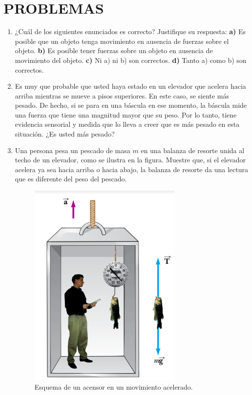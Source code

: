 \documentclass{article}
\begin{document}
\section*{PROBLEMAS}
\begin{enumerate}
\item ¿Cuál de los siguientes enunciados es correcto? Justifique su respuesta: \textbf{a)} Es posible que un objeto tenga movimiento en ausencia de fuerzas sobre el objeto. \textbf{b)} Es posible tener fuerzas sobre un objeto en ausencia de movimiento del objeto. \textbf{c)} Ni a) ni b) son correctos. \textbf{d)} Tanto a) como b) son correctos.

\item Es muy que probable que usted haya estado en un elevador que acelera hacia arriba mientras se mueve a pisos superiores. En este caso, se siente más pesado. De hecho, si se para en una báscula en ese momento, la báscula mide una fuerza que tiene una magnitud mayor que su peso. Por lo tanto, tiene evidencia sensorial y medida que lo lleva a creer que es más pesado en esta situación. ¿Es usted más pesado?

\item Una persona pesa un pescado de masa $m$ en una balanza de resorte unida al techo de un elevador, como se ilustra en la figura. Muestre que, si el elevador acelera ya sea hacia arriba o hacia abajo, la balanza de resorte da una lectura que es diferente del peso del pescado.

\begin{figure}[H]
\centering
\includegraphics[scale=0.4]{problema_3.png}
\caption{Esquema de un acensor en un movimiento acelerado.}
\end{figure}


\end{enumerate}
\end{document}

